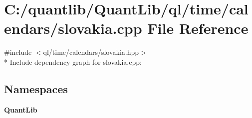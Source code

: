 \section{C\+:/quantlib/\+Quant\+Lib/ql/time/calendars/slovakia.cpp File Reference}
\label{slovakia_8cpp}
{\ttfamily \#include $<$ql/time/calendars/slovakia.\+hpp$>$}\\*
Include dependency graph for slovakia.\+cpp\+:
\subsection*{Namespaces}
\begin{DoxyCompactItemize}
\item 
 {\bf Quant\+Lib}
\end{DoxyCompactItemize}
